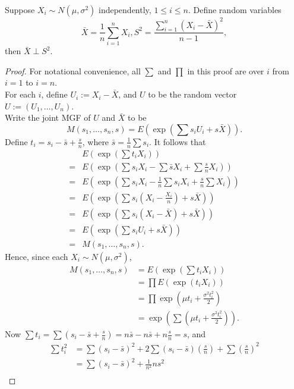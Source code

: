 \documentclass[11pt,fleqn]{book} %
\begin{document}
\begin{lemma} \label{lemma:337}
Suppose \(X_i \sim N(\mu, \sigma^2)\) independently, \(1 \leq i \leq n\). Define random variables
\[
\bar{X} = \frac1n\sum_{i=1}^n X_i, S^2 = \frac{\sum_{i=1}^n(X_i - \bar{X})^2}{n - 1},
\]
then \(\bar{X} \perp S^2\).
\end{lemma}
\begin{proof} For notational convenience, all \(\sum\) and \(\prod\) in this proof are over \(i\) from \(i = 1\) to \(i = n\).\\
\indent For each \(i\), define \(U_i := X_i - \bar{X}\), and \(U\) to be the random vector \(U := (U_1, \ldots, U_n)\). \\
\indent Write the joint MGF of \(U\) and \(\bar{X}\) to be
\[
M(s_1, \ldots, s_n, s) = E(\exp(\sum s_iU_i + s\bar{X})).
\]
Define \(t_i = s_i - \bar{s} + \frac{s}{n}\), where \(\bar{s} = \frac1n\sum s_i\). It follows that
\[
\begin{aligned}
&E(\exp(\sum t_iX_i)) \\
= &E\left(\exp\left(\sum s_iX_i - \sum \bar{s}X_i + \sum\frac{s}{n}X_i\right)\right) \\
= &E\left(\exp\left(\sum s_iX_i - \frac1n \sum s_iX_i + \frac{s}{n} \sum X_i\right)\right) \\
= &E\left(\exp\left(\sum s_i\left(X_i - \frac{X_i}{n}\right) + s\bar{X}\right)\right) \\
= &E\left(\exp\left(\sum s_i(X_i - \bar{X}) + s\bar{X}\right)\right) \\
= &E(\exp(\sum s_iU_i + s\bar{X})) \\
= &M(s_1, \ldots, s_n, s).
\end{aligned}
\]
\indent Hence, since each \(X_i \sim N(\mu, \sigma^2)\), 
\[
\begin{aligned}
M(s_1, \ldots, s_n, s) &= E(\exp(\sum t_iX_i)) \\
&= \prod E(\exp(t_iX_i)) \\
&= \prod \exp\left(\mu t_i + \frac{\sigma^2t_i^2}{2}\right) \\
&= \exp\left(\sum \left(\mu t_i + \frac{\sigma^2 t_i^2}{2}\right)\right).
\end{aligned}
\]
\indent Now \(\sum t_i = \sum\left(s_i - \bar{s} + \frac{s}{n}\right) = n\bar{s} - n\bar{s} + n\frac{s}{n} = s\), and
\[
\begin{aligned}
\sum t_i^2 &= \sum(s_i - \bar{s})^2 + 2\sum(s_i - \bar{s})\left(\frac{s}{n}\right) + \sum\left(\frac{s}{n}\right)^2 \\
&= \sum(s_i - \bar{s})^2 + \frac{1}{n^2}ns^2 \\

\end{aligned}\]
\end{proof}
\end{document}
